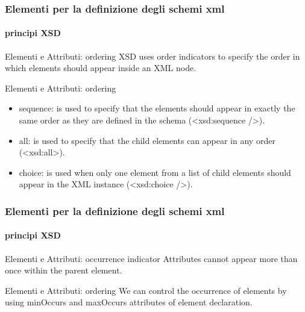 \begin{frame}
	\frametitle{Elementi per la definizione degli schemi xml}
	\framesubtitle{principi XSD}
	\addtocounter{nframe}{1}

	\begin{block}{Elementi e Attributi: ordering}
		XSD uses order indicators to specify the order in which elements should appear inside an XML node.
	\end{block}

	\begin{block}{Elementi e Attributi: ordering}
		\begin{itemize}
			\item sequence: is used to specify that the elements should appear in exactly the same order as they are defined in the schema (<xsd:sequence />).
			\item all: is used to specify that the child elements can appear in any order (<xsd:all>).
			\item choice: is used when only one element from a list of child elements should appear in the XML instance (<xsd:choice />).
		\end{itemize}
	\end{block}
\end{frame}

\begin{frame}
	\frametitle{Elementi per la definizione degli schemi xml}
	\framesubtitle{principi XSD}
	\addtocounter{nframe}{1}

	\begin{block}{Elementi e Attributi: occurrence indicator}
		Attributes cannot appear more than once within the parent element.
	\end{block}

	\begin{block}{Elementi e Attributi: ordering}
		We can control the occurrence of elements by using minOccurs and maxOccurs attributes of element declaration.
	\end{block}
\end{frame}


